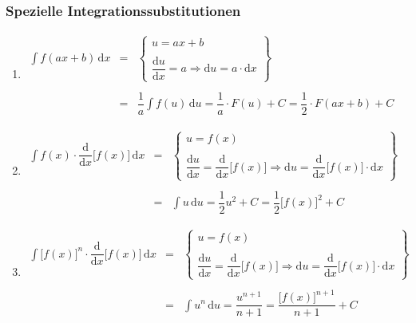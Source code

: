 \subsubsection{Spezielle Integrationssubstitutionen}
\begin{enumerate}[$(a)$]
\item $\begin{array}{lll}\displaystyle \int f\left(ax+b\right)\,\text{d}x&=&\left\{\begin{matrix}u=ax+b\\\\\dfrac{\text{d}u}{\text{d}x}=a\Rightarrow \text{d}u=a\cdot \text{d}x\end{matrix}\right\}\\\\&=&\dfrac{1}{a}\displaystyle \int f\left(u\right)\,\text{d}u=\dfrac{1}{a}\cdot F\left(u\right)+C=\dfrac{1}{2}\cdot F\left(ax+b\right)+C\end{array}$
\item $\begin{array}{lll}\displaystyle \int f\left(x\right)\cdot \dfrac{\text{d}}{\text{d}x}\Big[f\left(x\right)\Big]\,\text{d}x&=&\left\{\begin{matrix}u=f\left(x\right)\\\\\dfrac{\text{d}u}{\text{d}x}=\dfrac{\text{d}}{\text{d}x}\Big[f\left(x\right)\Big]\Rightarrow \text{d}u=\dfrac{\text{d}}{\text{d}x}\Big[f\left(x\right)\Big]\cdot \text{d}x\end{matrix}\right\}\\\\&=&\displaystyle \int u\,\text{d}u=\dfrac{1}{2}u^2+C=\dfrac{1}{2}\Big[f\left(x\right)\Big]^2+C\end{array}$
\item $\begin{array}{lll}\displaystyle \int \Big[f\left(x\right)\Big]^n\cdot \dfrac{\text{d}}{\text{d}x}\Big[f\left(x\right)\Big]\,\text{d}x&=&\left\{\begin{matrix}u=f\left(x\right)\\\\\dfrac{\text{d}u}{\text{d}x}=\dfrac{\text{d}}{\text{d}x}\Big[f\left(x\right)\Big]\Rightarrow \text{d}u=\dfrac{\text{d}}{\text{d}x}\Big[f\left(x\right)\Big]\cdot \text{d}x\end{matrix}\right\}\\\\&=&\displaystyle \int u^n\,\text{d}u=\dfrac{u^{n+1}}{n+1}=\dfrac{\Big[f\left(x\right)\Big]^{n+1}}{n+1}+C\end{array}$

\end{enumerate}
